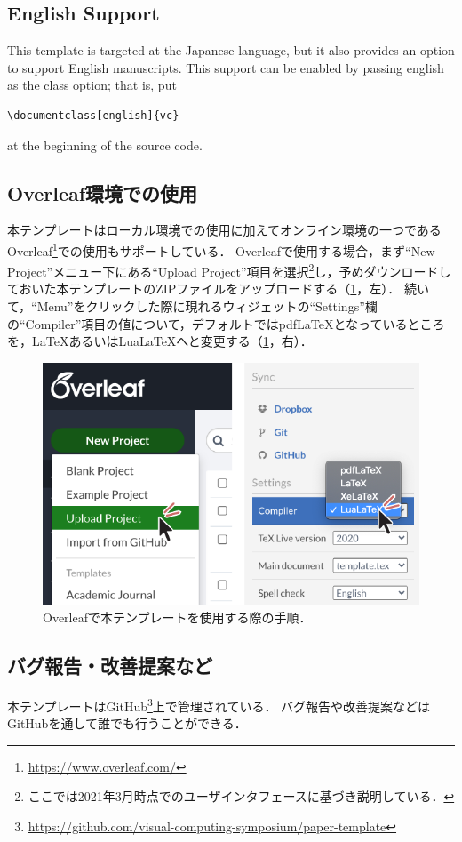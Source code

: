 \documentclass[anonymous]{vc}
\begin{document}
\subsection{English Support}

\noindent
This template is targeted at the Japanese language, but it also provides an option to support English manuscripts.
This support can be enabled by passing \textsf{english} as the class option; that is, put
\begin{verbatim}
\documentclass[english]{vc}
\end{verbatim}
at the beginning of the source code.

\subsection{Overleaf環境での使用}

本テンプレートはローカル環境での使用に加えてオンライン環境の一つであるOverleaf\footnote{\url{https://www.overleaf.com/}}での使用もサポートしている．
Overleafで使用する場合，まず``New Project''メニュー下にある``Upload Project''項目を選択\footnote{ここでは2021年3月時点でのユーザインタフェースに基づき説明している．}し，予めダウンロードしておいた本テンプレートのZIPファイルをアップロードする（\cref{fig:overleaf}，左）．
続いて，``Menu''をクリックした際に現れるウィジェットの``Settings''欄の``Compiler''項目の値について，デフォルトでは{pdfLaTeX}となっているところを，LaTeXあるいはLuaLaTeXへと変更する（\cref{fig:overleaf}，右）．

\begin{figure}
  \centering
  \includegraphics[width=\columnwidth]{./figures/overleaf.pdf}
  \caption{Overleafで本テンプレートを使用する際の手順．}
  \label{fig:overleaf}
\end{figure}

\subsection{バグ報告・改善提案など}

本テンプレートはGitHub\footnote{\url{https://github.com/visual-computing-symposium/paper-template}}上で管理されている．
バグ報告や改善提案などはGitHubを通して誰でも行うことができる．



\end{document}
